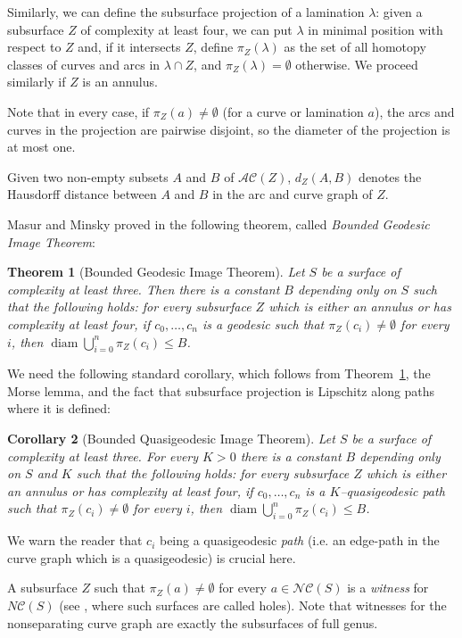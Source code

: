 \documentclass{amsart}
\newcommand{\C}{\mathcal{C}}
\newcommand{\NC}{\mathcal{NC}}
\newcommand{\dist}{d}
\newcommand{\diam}{\operatorname{diam}}
\newcommand{\AC}{\mathcal{AC}}
\newtheorem{thm}{Theorem}[section]
\newtheorem{cor}[thm]{Corollary}
\theoremstyle{definition}
\begin{document}
Similarly, we can define the subsurface projection of a lamination \(\lambda\): given a subsurface \(Z\) of complexity at least four, we can put \(\lambda\) in minimal position with respect to \(Z\) and, if it intersects \(Z\), define \(\pi_Z(\lambda)\) as the set of all homotopy classes of curves and arcs in \(\lambda\cap Z\), and \(\pi_Z(\lambda)=\emptyset\) otherwise. We proceed similarly if \(Z\) is an annulus.

Note that in every case, if \(\pi_Z(a)\neq\emptyset\) (for a curve or lamination \(a\)), the arcs and curves in the projection are pairwise disjoint, so the diameter of the projection is at most one.

Given two non-empty subsets \(A\) and \(B\) of \(\AC(Z)\), \(\dist_Z(A,B)\) denotes the Hausdorff distance between \(A\) and \(B\) in the arc and curve graph of \(Z\).

Masur and Minsky proved in \cite{mm_geometryII} the following theorem, called \emph{Bounded Geodesic Image Theorem}:

\begin{thm}[Bounded Geodesic Image Theorem]\label{thm:BGIT}
Let \(S\) be a surface of complexity at least three. Then there is a constant \(B\) depending only on \(S\) such that the following holds: for every subsurface \(Z\) which is either an annulus or has complexity at least four, if \(c_0,\dots,c_n\) is a geodesic such that \(\pi_Z(c_i)\neq\emptyset\) for every \(i\), then \(\diam \bigcup_{i=0}^n\pi_Z(c_i)\leq B\).
\end{thm}

We need the following standard corollary, which follows from
Theorem~\ref{thm:BGIT}, the Morse lemma, and the fact that subsurface
projection is Lipschitz along paths where it is defined:
\begin{cor}[Bounded Quasigeodesic Image Theorem]\label{cor:qBGIT}
  Let \(S\) be a surface of complexity at least three. For every $K>0$
  there is a constant \(B\) depending only on \(S\) and $K$ such that
  the following holds: for every subsurface \(Z\) which is either an
  annulus or has complexity at least four, if \(c_0,\dots,c_n\) is a
  $K$--quasigeodesic path such that \(\pi_Z(c_i)\neq\emptyset\) for
  every \(i\), then \(\diam \bigcup_{i=0}^n\pi_Z(c_i)\leq B\).
\end{cor}
We warn the reader that $c_i$ being a quasigeodesic \emph{path}
(i.e. an edge-path in the curve graph which is a quasigeodesic) is
crucial here.

A subsurface \(Z\) such that \(\pi_Z(a)\neq\emptyset\) for every \(a\in\NC(S)\) is a \emph{witness} for \(N\C(S)\) (see \cite{ms_geometry}, where such surfaces are called holes). Note that witnesses for the nonseparating curve graph are exactly the subsurfaces of full genus. 
\end{document}
